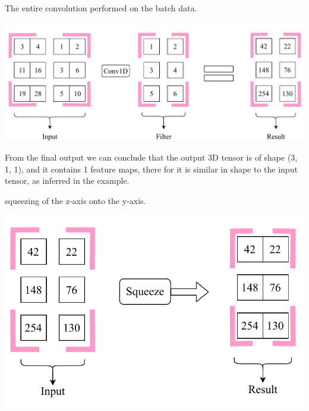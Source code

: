 \documentclass[a4paper, 12pt]{report}
\begin{document}
\begin{blockfigure}{The entire convolution performed on the batch data.}
	\begin{center}
		\includegraphics[width = \textwidth]{secondConvSample_final}
	\end{center}
\end{blockfigure}
\vspace{40pt}
From the final output we can conclude that the output 3D tensor is of shape (3, 1, 1), and it contains 1 feature maps, there for it is similar in shape to the input tensor, as inferred in the example.
\vspace{40pt}
\begin{blockfigure}{squeezing of the z-axis onto the y-axis.}
	\begin{center}
		\includegraphics[width = \textwidth]{squeeze}
	\end{center}
\end{blockfigure}
\newpage
\end{document}
